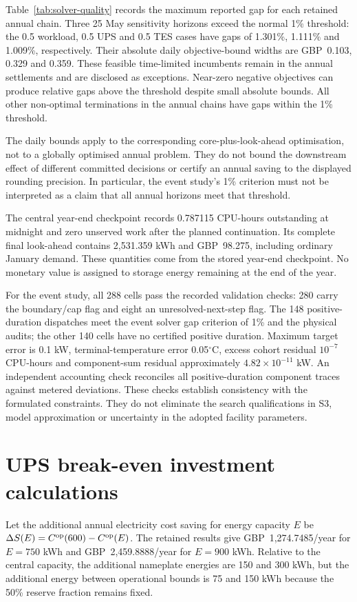 

Table~\ref{tab:solver-quality} records the maximum reported gap for each retained annual chain. Three 25 May sensitivity horizons exceed the normal 1\% threshold: the 0.5 workload, 0.5 UPS and 0.5 TES cases have gaps of 1.301\%, 1.111\% and 1.009\%, respectively. Their absolute daily objective-bound widths are GBP~0.103, 0.329 and 0.359. These feasible time-limited incumbents remain in the annual settlements and are disclosed as exceptions. Near-zero negative objectives can produce relative gaps above the threshold despite small absolute bounds. All other non-optimal terminations in the annual chains have gaps within the 1\% threshold.

The daily bounds apply to the corresponding core-plus-look-ahead optimisation, not to a globally optimised annual problem. They do not bound the downstream effect of different committed decisions or certify an annual saving to the displayed rounding precision. In particular, the event study's 1\% criterion must not be interpreted as a claim that all annual horizons meet that threshold.

The central year-end checkpoint records 0.787115 CPU-hours outstanding at midnight and zero unserved work after the planned continuation. Its complete final look-ahead contains 2,531.359 kWh and GBP~98.275, including ordinary January demand. These quantities come from the stored year-end checkpoint. No monetary value is assigned to storage energy remaining at the end of the year.

For the event study, all 288 cells pass the recorded validation checks: 280 carry the boundary/cap flag and eight an unresolved-next-step flag. The 148 positive-duration dispatches meet the event \textcolor{LatestGreen}{solver gap} criterion of 1\% and the physical audits; the other 140 cells have no certified positive duration. Maximum target error is 0.1 kW, terminal-temperature error 0.05$^{\circ}$C, excess cohort residual $10^{-7}$ CPU-hours and component-sum residual approximately $4.82\times10^{-11}$ kW. An independent accounting check reconciles all positive-duration component traces against metered deviations. These checks establish consistency with the formulated constraints. They do not eliminate the search qualifications in S3, model approximation or uncertainty in the adopted facility parameters.

\section{\textcolor{LatestGreen}{UPS break-even investment calculations}}
Let the additional annual \textcolor{LatestGreen}{electricity cost} saving for energy capacity $E$ be $\Delta S(E)=C^{\mathrm{op}}(600)-C^{\mathrm{op}}(E)$. The retained results give GBP~1,274.7485/year for $E=750$ kWh and GBP~2,459.8888/year for $E=900$ kWh. Relative to the central capacity, the additional nameplate energies are 150 and 300 kWh, but the additional energy between operational bounds is 75 and 150 kWh because the 50\% reserve fraction remains fixed.

